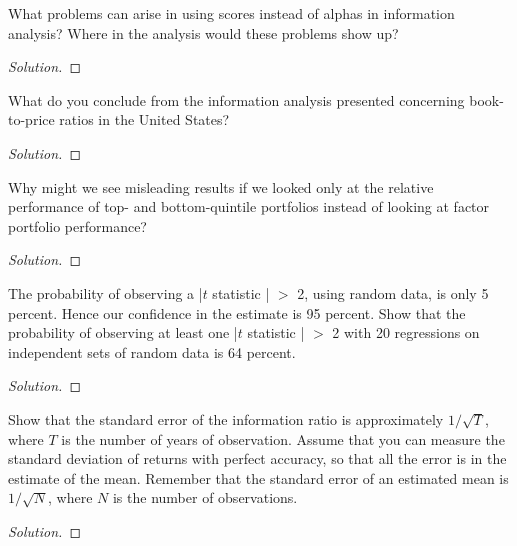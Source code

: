 \begin{problem}{12.1}
  What problems can arise in using scores instead of alphas in information analysis? Where in the analysis would these problems show up?
\end{problem}

\begin{proof}[Solution]
\end{proof}

\begin{problem}{12.2}
  What do you conclude from the information analysis presented concerning book-to-price ratios in the United States?
\end{problem}

\begin{proof}[Solution]
\end{proof}

\begin{problem}{12.3}
  Why might we see misleading results if we looked only at the relative performance of top- and bottom-quintile portfolios instead of looking at factor portfolio performance?
\end{problem}

\begin{proof}[Solution]
\end{proof}

\begin{problem}{12.4}
  The probability of observing a |$t$ statistic | $>$ 2, using random data, is only 5 percent. Hence our confidence in the estimate is 95 percent. Show that the probability of observing at least one |$t$ statistic | $>$ 2 with 20 regressions on independent sets of random data is 64 percent.
\end{problem}

\begin{proof}[Solution]
\end{proof}

\begin{problem}{12.5}
  Show that the standard error of the information ratio is approximately $1/\sqrt{T}$, where $T$ is the number of years of observation. Assume that you can measure the standard deviation of returns with perfect accuracy, so that all the error is in the estimate of the mean. Remember that the standard error of an estimated mean is $1/\sqrt{N}$, where $N$ is the number of observations.
\end{problem}

\begin{proof}[Solution]
\end{proof}


